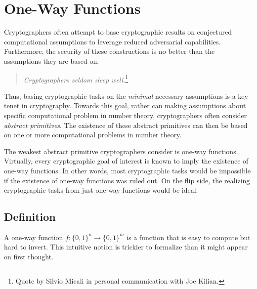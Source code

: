 \newcommand{\binset}[1]{\{0,1\}^{#1}}
\newcommand{\binfunc}[2]{\binset{#1}\rightarrow\binset{#2}}
\chapter{One-Way Functions}
\label{sec:owf}

\label{ssec:owf}
Cryptographers often attempt to base cryptographic results on conjectured computational assumptions to leverage reduced adversarial capabilities. Furthermore, the security of these constructions is no better than the assumptions they are based on. 
\begin{quote}
\emph{Cryptographers seldom sleep well.}\footnote{Quote by Silvio Micali in personal communication with Joe Kilian.}
\end{quote}
Thus, basing cryptographic tasks on the \emph{minimal} necessary assumptions is a key tenet in cryptography. Towards this goal, rather can making assumptions about specific computational problem in number theory, cryptographers often consider \emph{abstract primitives}. The existence of these abstract primitives can then be based on one or more computational problems in number theory.

The weakest abstract primitive cryptographers consider is one-way functions. Virtually, every cryptographic goal of interest is known to imply the existence of one-way functions. In other words, most cryptographic tasks would be impossible if the existence of one-way functions was ruled out. On the flip side, the realizing cryptographic tasks from just one-way functions would be ideal. 

\section{Definition}
A one-way function $f: \{0,1\}^n \rightarrow \{0,1\}^m$ is a function that is easy to compute but hard to invert. This intuitive notion is trickier to formalize than it might appear on first thought.


